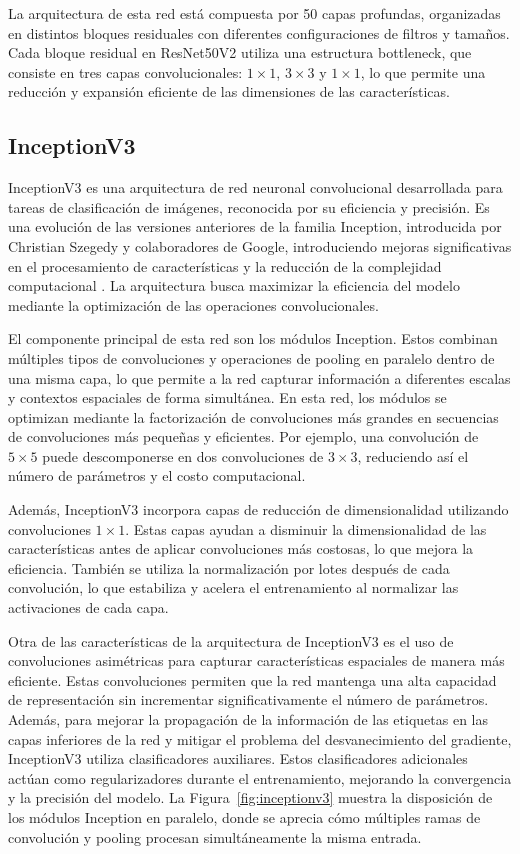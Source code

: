 La arquitectura de esta red está compuesta por 50 capas profundas, organizadas en
distintos bloques residuales con diferentes configuraciones de filtros y tamaños. Cada
bloque residual en ResNet50V2 utiliza una estructura bottleneck, que consiste en tres
capas convolucionales: $1 \times 1$, $3 \times 3$ y $1 \times 1$, lo que permite una
reducción y expansión eficiente de las dimensiones de las características.

\subsection{InceptionV3}

InceptionV3 es una arquitectura de red neuronal convolucional desarrollada para tareas de
clasificación de imágenes, reconocida por su eficiencia y precisión. Es una evolución de
las versiones anteriores de la familia Inception, introducida por Christian Szegedy y
colaboradores de Google, introduciendo mejoras significativas en el procesamiento de
características y la reducción de la complejidad computacional
. La arquitectura busca maximizar la eficiencia del
modelo mediante la optimización de las operaciones convolucionales.

El componente principal de esta red son los módulos Inception. Estos combinan múltiples
tipos de convoluciones y operaciones de pooling en paralelo dentro de una misma capa, lo
que permite a la red capturar información a diferentes escalas y contextos espaciales de
forma simultánea. En esta red, los módulos se optimizan mediante la factorización de
convoluciones más grandes en secuencias de convoluciones más pequeñas y eficientes. Por
ejemplo, una convolución de $5 \times 5$ puede descomponerse en dos convoluciones de $3
\times 3$, reduciendo así el número de parámetros y el costo computacional.

Además, InceptionV3 incorpora capas de reducción de dimensionalidad utilizando
convoluciones $1 \times 1$. Estas capas ayudan a disminuir la dimensionalidad de las
características antes de aplicar convoluciones más costosas, lo que mejora la eficiencia.
También se utiliza la normalización por lotes después de cada convolución, lo que
estabiliza y acelera el entrenamiento al normalizar las activaciones de cada capa.

Otra de las características de la arquitectura de InceptionV3 es el uso de convoluciones
asimétricas para capturar características espaciales de manera más eficiente. Estas
convoluciones permiten que la red mantenga una alta capacidad de representación sin
incrementar significativamente el número de parámetros. Además, para mejorar la
propagación de la información de las etiquetas en las capas inferiores de la red y
mitigar el problema del desvanecimiento del gradiente, InceptionV3 utiliza clasificadores
auxiliares. Estos clasificadores adicionales actúan como regularizadores durante el
entrenamiento, mejorando la convergencia y la precisión del modelo. La
Figura~\ref{fig:inceptionv3} muestra la disposición de los módulos Inception en paralelo,
donde se aprecia cómo múltiples ramas de convolución y pooling procesan simultáneamente
la misma entrada.

